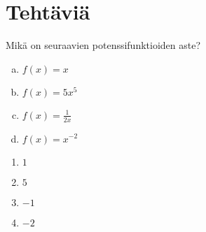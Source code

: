 


\section*{Tehtäviä}

\begin{tehtava}
Mikä on seuraavien potenssifunktioiden aste?
\begin{enumerate}[a)]
\item $f(x) = x$
\item $f(x) = 5x^5$
\item $f(x) = \frac{1}{2x}$
\item $f(x) = x^{-2}$
\end{enumerate}
\begin{vastaus}
\begin{enumerate}
\item $1$
\item $5$
\item $-1$
\item $-2$
\end{enumerate}
\end{vastaus}
\end{tehtava}
